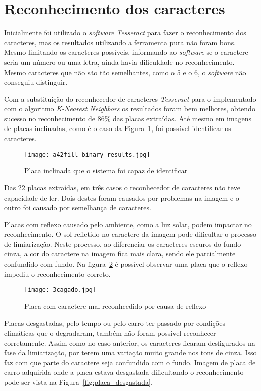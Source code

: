 \section{Reconhecimento dos caracteres}
\label{sec:reconhecimento_dos_caracteres_resultados}

Inicialmente foi utilizado o \emph{software Tesseract} para fazer o
reconhecimento dos caracteres, mas os resultados utilizando a ferramenta pura
não foram bons. Mesmo limitando os caracteres possíveis, informando ao
\emph{software} se o caractere seria um número ou uma letra, ainda havia
dificuldade no reconhecimento. Mesmo caracteres que não são tão semelhantes,
como o 5 e o 6, o \emph{software} não conseguiu distinguir.

Com a substituição do reconhecedor de caracteres \emph{Tesseract} para o
implementado com o algoritmo \emph{K-Nearest Neighbors} os resultados foram bem
melhores, obtendo sucesso no reconhecimento de 86\% das placas extraídas. Até
mesmo em imagens de placas inclinadas, como é o caso da
Figura~\ref{fig:plate_torta_result}, foi possível identificar os caracteres.

\begin{figure}[H]
	\centering
	\texttt{[image: a42fill\_binary\_results.jpg]}
	\caption{Placa inclinada que o sistema foi capaz de identificar}
	\label{fig:plate_torta_result}
\end{figure}

Das 22 placas extraídas, em três casos o reconhecedor de caracteres não teve
capacidade de ler. Dois destes foram causados por problemas na imagem e o outro
foi causado por semelhança de caracteres.

Placas com reflexo causado pelo ambiente, como a luz solar, podem impactar no
reconhecimento. O sol refletido no caractere da imagem pode dificultar o
processo de limiarização. Neste processo, ao diferenciar os caracteres escuros
do fundo cinza, a cor do caractere na imagem fica mais clara, sendo ele
parcialmente confundido com fundo. Na figura~\ref{fig:cagado_reflexo} é possível
observar uma placa que o reflexo impediu o reconhecimento correto.

\begin{figure}[H]
	\centering
	\texttt{[image: 3cagado.jpg]}
	\caption{Placa com caractere mal reconhcedido por causa de reflexo}
	\label{fig:cagado_reflexo}
\end{figure}

Placas desgastadas, pelo tempo ou pelo carro ter passado por condições climáticas que o degradaram, também não foram possível reconhecer corretamente. Assim como no caso anterior, os caracteres ficaram desfigurados na fase da limiarização, por terem uma variação muito grande nos tons de cinza. Isso faz com que parte do caractere seja confundido com o fundo. Imagem de placa de carro adquirida onde a placa estava desgastada dificultando o reconhecimento pode ser vista na Figura~\ref{fig:placa_desgastada}.

